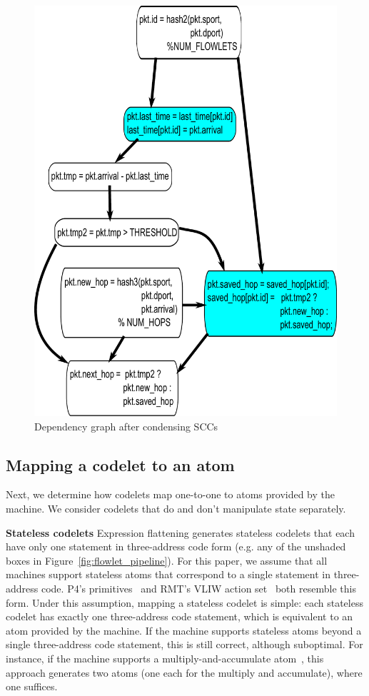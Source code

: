 \begin{figure}[!t]
\begin{minipage}{0.5\textwidth}
\includegraphics[width=\columnwidth]{scc.pdf}
\caption{Dependency graph after condensing SCCs}
\label{fig:partitioning_after}
\end{minipage}
\end{figure}

\subsection{Mapping a codelet to an atom}
\label{ss:code_gen}
Next, we determine how codelets map one-to-one to atoms provided by the
\absmachine machine. We consider codelets that do and don't manipulate state
separately.

\textbf{Stateless codelets}
Expression flattening generates stateless codelets that each have only one
statement in three-address code form (e.g. any of the unshaded boxes in
Figure~\ref{fig:flowlet_pipeline}). For this paper, we assume that all
\absmachine machines support stateless atoms that correspond to a single
statement in three-address code. P4's primitives~\cite{p4spec} and RMT's VLIW
action set~\cite{rmt} both resemble this form. Under this assumption, mapping a
stateless codelet is simple: each stateless codelet has exactly one
three-address code statement, which is equivalent to an atom provided by the
\absmachine machine. If the \absmachine machine supports stateless atoms beyond
a single three-address code statement, this is still correct, although
suboptimal. For instance, if the \absmachine machine supports a
multiply-and-accumulate atom~\cite{mac}, this approach generates two atoms (one
each for the multiply and accumulate), where one suffices.

